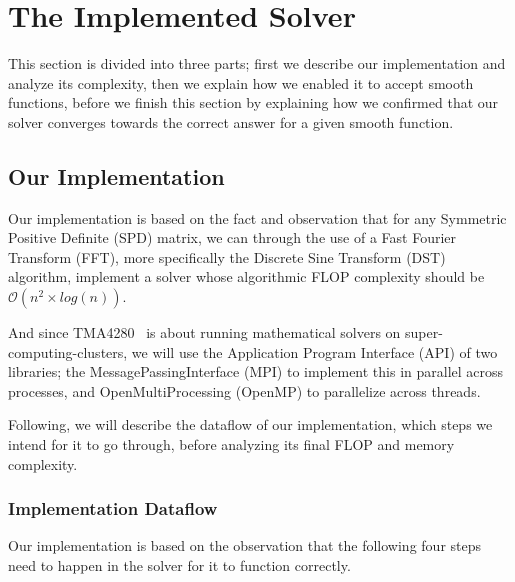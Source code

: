 \documentclass[fontsize=11pt,paper=a4,titlepage]{article}
\begin{document}
\section{The Implemented Solver}

This section is divided into three parts; first we describe our implementation
and analyze its complexity, then we explain how we enabled it to accept smooth
functions, before we finish this section by explaining how we confirmed that our
solver converges towards the correct answer for a given smooth function.

\subsection{Our Implementation}
\label{sec:Impl}

Our implementation is based on the fact and observation that for any Symmetric
Positive Definite (SPD) matrix, we can through the use of a Fast Fourier
Transform (FFT), more specifically the Discrete Sine Transform (DST)
algorithm, implement a solver whose algorithmic FLOP complexity should be
$\mathcal{O}(n^2\times log(n))$.

And since TMA4280~\cite{tma4280} is about running mathematical solvers on
super-computing-clusters, we will use the Application Program Interface (API)
of two libraries; the MessagePassingInterface (MPI) to implement this in
parallel across processes, and OpenMultiProcessing (OpenMP) to parallelize
across threads.

Following, we will describe the dataflow of our implementation, which steps we
intend for it to go through, before analyzing its final FLOP and memory
complexity.

\subsubsection{Implementation Dataflow}
\label{sssec:dataflow}

Our implementation is based on the observation that the following four steps
need to happen in the solver for it to function correctly.
\end{document}

